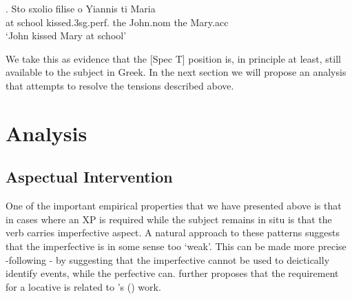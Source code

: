 \documentclass[11pt]{article}
\newcommand{\citeposs}[1]{\citeauthor{#1}'s (\citeyear{#1})}
\begin{document}
\ex.
Sto sxolio filise o Yiannis ti Maria\\
at school kissed.3sg.perf. the John.nom the Mary.acc\\
`John kissed Mary at school'

We take this as evidence that the [Spec T] position is, in principle at least, still available to the subject in Greek. In the next section we will propose an analysis that attempts to resolve the tensions described above.
 



\section{Analysis}


\subsection{Aspectual Intervention}\label{aspin}
One of the important empirical properties that we have presented above is that in cases where an XP is required while the subject remains in situ is that the verb carries imperfective aspect.  A natural approach to these patterns suggests that the imperfective is in some sense too `weak'.  This can be made more precise -following \citet{alexiadou:11b}- by suggesting that the imperfective cannot be used to deictically identify events, while the perfective can.  \citet{alexiadou:11b} further proposes that the requirement for a locative is related to \citeposs{partee-borchev:05} work.
\end{document}
